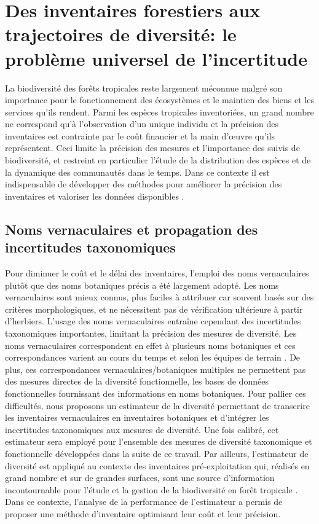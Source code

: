 \documentclass[
  11pt,
  french,
  A4paper,
  extrafontsizes,onecolumn,openright
  ]{memoir}
\begin{document}
\chapter{Des inventaires forestiers aux trajectoires de diversité: le
problème universel de
l'incertitude}\label{des-inventaires-forestiers-aux-trajectoires-de-diversite-le-probleme-universel-de-lincertitude}

La biodiversité des forêts tropicales reste largement méconnue malgré
son importance pour le fonctionnement des écosystèmes et le maintien des
biens et les services qu'ils rendent. Parmi les espèces tropicales
inventoriées, un grand nombre ne correspond qu'à l'observation d'un
unique individu \autocite{Feeley2011} et la précision des inventaires
est contrainte par le coût financier et la main d'œuvre qu'ils
représentent. Ceci limite la précision des mesures et l'importance des
suivis de biodiversité, et restreint en particulier l'étude de la
distribution des espèces et de la dynamique des communautés dans le
temps. Dans ce contexte il est indispensable de développer des méthodes
pour améliorer la précision des inventaires et valoriser les données
disponibles \autocite{Baraloto2012}.

\section{Noms vernaculaires et propagation des incertitudes
taxonomiques}\label{noms-vernaculaires-et-propagation-des-incertitudes-taxonomiques}

Pour diminuer le coût et le délai des inventaires, l'emploi des noms
vernaculaires plutôt que des noms botaniques précis a été largement
adopté. Les noms vernaculaires sont mieux connus, plus faciles à
attribuer car souvent basés sur des critères morphologiques, et ne
nécessitent pas de vérification ultérieure à partir d'herbiers. L'usage
des noms vernaculaires entraîne cependant des incertitudes taxonomiques
importantes, limitant la précision des mesures de diversité. Les noms
vernaculaires correspondent en effet à plusieurs noms botaniques et ces
correspondances varient au cours du temps et selon les équipes de
terrain \autocite{Oldeman1968}. De plus, ces correspondances
vernaculaires/botaniques multiples ne permettent pas des mesures
directes de la diversité fonctionnelle, les bases de données
fonctionnelles fournissant des informations en noms botaniques. Pour
pallier ces difficultés, nous proposons un estimateur de la diversité
permettant de transcrire les inventaires vernaculaires en inventaires
botaniques et d'intégrer les incertitudes taxonomiques aux mesures de
diversité. Une fois calibré, cet estimateur sera employé pour l'ensemble
des mesures de diversité taxonomique et fonctionnelle développées dans
la suite de ce travail. Par ailleurs, l'estimateur de diversité est
appliqué au contexte des inventaires pré-exploitation qui, réalisés en
grand nombre et sur de grandes surfaces, sont une source d'information
incontournable pour l'étude et la gestion de la biodiversité en forêt
tropicale \autocites{TerSteege2000}{Guitet2014b}. Dans ce contexte,
l'analyse de la performance de l'estimateur a permis de proposer une
méthode d'inventaire optimisant leur coût et leur précision.
\end{document}
